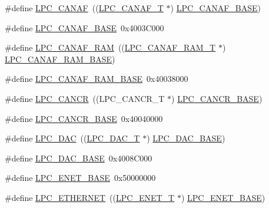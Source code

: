 \begin{DoxyCompactItemize}
\#define \hyperlink{group__PERIPH__175X__6X__BASE_ga4f738c971938302f38d54e662c9f7774}{L\+P\+C\+\_\+\+C\+A\+N\+AF}~((\hyperlink{structLPC__CANAF__T}{L\+P\+C\+\_\+\+C\+A\+N\+A\+F\+\_\+T}            $\ast$) \hyperlink{group__PERIPH__407X__8X__BASE_gabc6943f9e943d63ecf4e236b4ce7c344}{L\+P\+C\+\_\+\+C\+A\+N\+A\+F\+\_\+\+B\+A\+SE})
\item 
\#define \hyperlink{group__PERIPH__175X__6X__BASE_gabc6943f9e943d63ecf4e236b4ce7c344}{L\+P\+C\+\_\+\+C\+A\+N\+A\+F\+\_\+\+B\+A\+SE}~0x4003\+C000
\item 
\#define \hyperlink{group__PERIPH__175X__6X__BASE_gaf02b7bcdc41a045910b3f0bae8a8f4b0}{L\+P\+C\+\_\+\+C\+A\+N\+A\+F\+\_\+\+R\+AM}~((\hyperlink{structLPC__CANAF__RAM__T}{L\+P\+C\+\_\+\+C\+A\+N\+A\+F\+\_\+\+R\+A\+M\+\_\+T}        $\ast$) \hyperlink{group__PERIPH__407X__8X__BASE_ga9d4f2bac61e26b32ad64d62f2be50e49}{L\+P\+C\+\_\+\+C\+A\+N\+A\+F\+\_\+\+R\+A\+M\+\_\+\+B\+A\+SE})
\item 
\#define \hyperlink{group__PERIPH__175X__6X__BASE_ga9d4f2bac61e26b32ad64d62f2be50e49}{L\+P\+C\+\_\+\+C\+A\+N\+A\+F\+\_\+\+R\+A\+M\+\_\+\+B\+A\+SE}~0x40038000
\item 
\#define \hyperlink{group__PERIPH__175X__6X__BASE_gadc209557a5736e29149b96018056fc29}{L\+P\+C\+\_\+\+C\+A\+N\+CR}~((L\+P\+C\+\_\+\+C\+A\+N\+C\+R\+\_\+T            $\ast$) \hyperlink{group__PERIPH__407X__8X__BASE_gac22b88e108d620661add143c174f8f11}{L\+P\+C\+\_\+\+C\+A\+N\+C\+R\+\_\+\+B\+A\+SE})
\item 
\#define \hyperlink{group__PERIPH__175X__6X__BASE_gac22b88e108d620661add143c174f8f11}{L\+P\+C\+\_\+\+C\+A\+N\+C\+R\+\_\+\+B\+A\+SE}~0x40040000
\item 
\#define \hyperlink{group__PERIPH__175X__6X__BASE_ga5b94918e9ea326d84ab862a5d377903b}{L\+P\+C\+\_\+\+D\+AC}~((\hyperlink{structLPC__DAC__T}{L\+P\+C\+\_\+\+D\+A\+C\+\_\+T}              $\ast$) \hyperlink{group__PERIPH__407X__8X__BASE_ga3bbaedad584252212d4704bb419489f6}{L\+P\+C\+\_\+\+D\+A\+C\+\_\+\+B\+A\+SE})
\item 
\#define \hyperlink{group__PERIPH__175X__6X__BASE_ga3bbaedad584252212d4704bb419489f6}{L\+P\+C\+\_\+\+D\+A\+C\+\_\+\+B\+A\+SE}~0x4008\+C000
\item 
\#define \hyperlink{group__PERIPH__175X__6X__BASE_ga73c18d53000abe3814c4b787cd83a57c}{L\+P\+C\+\_\+\+E\+N\+E\+T\+\_\+\+B\+A\+SE}~0x50000000
\item 
\#define \hyperlink{group__PERIPH__175X__6X__BASE_gaddb977e4442891b21ced3344c71440d7}{L\+P\+C\+\_\+\+E\+T\+H\+E\+R\+N\+ET}~((\hyperlink{structLPC__ENET__T}{L\+P\+C\+\_\+\+E\+N\+E\+T\+\_\+T}             $\ast$) \hyperlink{group__PERIPH__407X__8X__BASE_ga73c18d53000abe3814c4b787cd83a57c}{L\+P\+C\+\_\+\+E\+N\+E\+T\+\_\+\+B\+A\+SE})

\end{DoxyCompactItemize}
